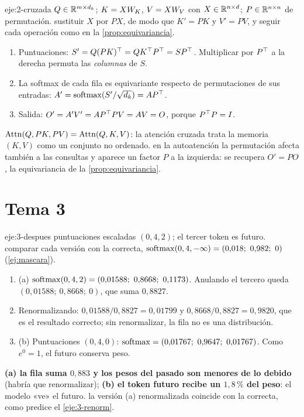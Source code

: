 \begin{solucion}{eje:2-cruzada}
\datos $Q\in\mathbb{R}^{m\times d_k}$; $K=XW_{K}$, $V=XW_{V}$ con $X\in\mathbb{R}^{n\times d}$; $P\in\mathbb{R}^{n\times n}$ de permutación.
\planteamiento sustituir $X$ por $PX$, de modo que $K'=PK$ y $V'=PV$, y seguir cada operación como en la \cref{prop:equivariancia}.
\pasos
\begin{enumerate}[label=\arabic*.]
  \item Puntuaciones: $S'=Q(PK)^{\top}=QK^{\top} P^{\top}=SP^{\top}$. Multiplicar por $P^{\top}$ a la derecha permuta las \emph{columnas} de $S$.
  \item La softmax de cada fila es equivariante respecto de permutaciones de sus entradas: $A'=\operatorname{softmax}(S'/\sqrt{d_k})=AP^{\top}$.
  \item Salida: $O'=A'V'=AP^{\top} PV=AV=O$, porque $P^{\top} P=I$.
\end{enumerate}
\resultado \textbf{$\operatorname{Attn}(Q,PK,PV)=\operatorname{Attn}(Q,K,V)$}: la atención cruzada trata la memoria $(K,V)$ como un conjunto no ordenado.
\comprobacion en la autoatención la permutación afecta también a las consultas y aparece un factor $P$ a la izquierda: se recupera $O'=PO$, la equivariancia de la \cref{prop:equivariancia}.
\end{solucion}

\section{Tema 3}

\begin{solucion}{eje:3-despues}
\datos puntuaciones escaladas $(0,4,2)$; el tercer token es futuro.
\planteamiento comparar cada versión con la correcta, $\softmax(0,4,-\infty)=(0{,}018;\allowbreak\ 0{,}982;\allowbreak\ 0)$ (\cref{ej:mascara}).
\pasos
\begin{enumerate}[label=\arabic*.]
  \item (a) $\softmax(0,4,2)=(0{,}01588;\allowbreak\ 0{,}8668;\allowbreak\ 0{,}1173)$. Anulando el tercero queda $(0{,}01588;\allowbreak\ 0{,}8668;\allowbreak\ 0)$, que suma $0{,}8827$.
  \item Renormalizando: $0{,}01588/0{,}8827=0{,}01799$ y $0{,}8668/0{,}8827=0{,}9820$, que es el resultado correcto; sin renormalizar, la fila no es una distribución.
  \item (b) Puntuaciones $(0,4,0)$: $\softmax=(0{,}01767;\allowbreak\ 0{,}9647;\allowbreak\ 0{,}01767)$. Como $e^{0}=1$, el futuro conserva peso.
\end{enumerate}
\resultado \textbf{(a) la fila suma $0{,}883$ y los pesos del pasado son menores de lo debido} (habría que renormalizar); \textbf{(b) el token futuro recibe un $1{,}8\,\%$ del peso}: el modelo «ve» el futuro.
\comprobacion la versión (a) renormalizada coincide con la correcta, como predice el \cref{eje:3-renorm}.
\end{solucion}

